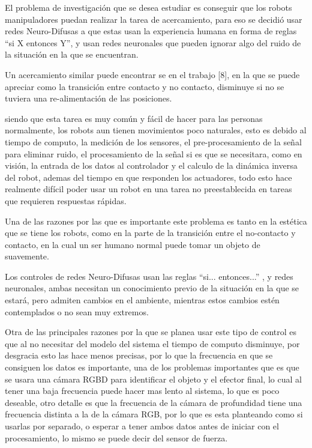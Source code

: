 El problema de investigación que se desea estudiar es conseguir que los robots manipuladores puedan realizar la tarea de acercamiento, para eso se decidió usar redes Neuro-Difusas a que estas usan la experiencia humana en forma de reglas “si X entonces Y”, y usan redes neuronales que pueden ignorar algo del ruido de la situación en la que se encuentran.

Un acercamiento similar puede encontrar se en el trabajo [8], en la que se puede apreciar como la transición entre contacto y no contacto, disminuye si no se tuviera una re-alimentación de las posiciones.

siendo que esta tarea es muy común y fácil de hacer para las personas normalmente, los robots aun tienen movimientos 
poco naturales, esto es debido al tiempo de computo, la medición de los sensores, el pre-procesamiento de la señal para eliminar ruido, el procesamiento de la señal si es que se necesitara, como en visión, la entrada de los datos al controlador y el calculo de la dinámica inversa del robot, ademas del tiempo en que responden los actuadores, todo esto hace realmente difícil poder usar un robot en una tarea no preestablecida en tareas que requieren respuestas rápidas.

Una de las razones por las que es importante este problema es tanto en la estética que se tiene los robots,  como en la parte de la transición entre el no-contacto y contacto, en la cual un ser humano normal puede tomar un objeto de suavemente.

Los controles de redes Neuro-Difusas usan las reglas “si... entonces...” , y redes neuronales, ambas necesitan un conocimiento previo de la situación en la que se estará, pero admiten cambios en el ambiente, mientras estos cambios estén contemplados  o no sean muy extremos.

Otra de las principales razones por la que se planea usar este tipo de control es que al no necesitar del modelo del sistema el tiempo de computo disminuye, por desgracia esto las hace menos precisas, por lo que la frecuencia en que se consiguen los datos es importante, una de los problemas importantes que es que se usara una cámara RGBD para identificar el objeto y el efector final, lo cual al tener una baja frecuencia puede hacer mas lento al sistema, lo que es poco deseable, otro detalle es que la frecuencia de la cámara de profundidad tiene una frecuencia distinta a la de la cámara RGB, por lo que es esta planteando como si usarlas por separado, o esperar a tener ambos datos antes de iniciar con el procesamiento, lo mismo se puede decir del sensor de fuerza.

